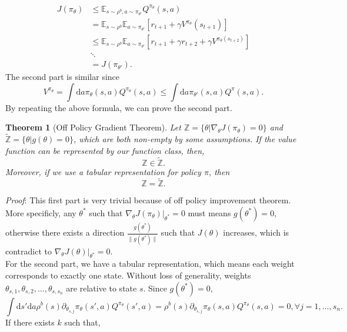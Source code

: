 \documentclass[11pt,a4paper]{article}
\def\tilde{\widetilde}
\def\d{{\mathrm d}}
\def\Z{{\mathbb Z}}
\def\tilde{\widetilde}
\def\E{\mathbb{E}}
\newtheorem{theorem}{Theorem}[subsection]
\begin{document}
\begin{align}
J(\pi_{\theta}) & \le \E_{s\sim \rho^b, a\sim \pi_{\theta'}}Q^{\pi_{\theta}}(s,a) \\ 
& = \E_{s\sim \rho^b}\E_{a\sim \pi_{\theta'}} [r_{t+1} + \gamma V^{\pi_{\theta}}(s_{t+1})] \\ 
& \le \E_{s\sim \rho^b}\E_{a\sim \pi_{\theta'}}[r_{t+1}+\gamma r_{t+2}+\gamma V^{\pi_{\theta}(s_{t+2})}] \\ 
& \ddots \\ 
& = J(\pi_{\theta'}).
\end{align}
The second part is similar since
\begin{equation}
V^{\pi_{\theta}} = \int \d a \pi_{\theta}(s,a)Q^{\pi_{\theta}}(s,a) \le \int \d a \pi_{\theta'}(s,a)Q^{\pi}(s,a).
\end{equation}
By repeating the above formula, we can prove the second part.
\begin{theorem}[Off Policy Gradient Theorem]
Let $\Z = \{\theta|\nabla_{\theta}J(\pi_{\theta})=0\}$ and $\tilde{\Z}=\{\theta|g(\theta)=0\}$, which are both non-empty by some assumptions. If the value function can be represented by our function class, then,
\begin{equation}
\Z \in \tilde{\Z}.
\end{equation}
Moreover, if we use a tabular representation for policy $\pi$, then
\begin{equation}
\Z = \tilde{\Z}.
\end{equation}
\end{theorem}
\emph{Proof}:
This first part is very trivial because of off policy improvement theorem. More specificly, any $\theta^*$ such that $\nabla_{\theta}J(\pi_{\theta})|_{\theta^*}=0$ must means $g(\theta^*) =0$, otherwise there exists a direction $\frac{g(\theta^*)}{\|g(\theta^*)\|}$ such that $J(\theta)$ increases, which is contradict to $\nabla_{\theta} J(\theta)|_{\theta^*}=0$.\\ 
For the second part, we have a tabular representation, which means each weight corresponds to exactly one state. Without loss of generality, weights $\theta_{s,1},\theta_{s,2},\ldots,\theta_{s,s_n}$ are relative to state $s$. Since $g(\theta^*) = 0$,
\begin{equation}
\label{eq:tabular1}
\int \d s' \d a \rho^b(s)\partial_{\theta_{s,j}}\pi_{\theta}(s',a) Q^{\pi_{\theta}}(s',a)= \rho^{b}(s)\partial_{\theta_{s,j}}\pi_{\theta}(s,a) Q^{\pi_{\theta}}(s,a) = 0, \forall j=1,\ldots,s_n.
\end{equation}
If there exists $k$ such that,
\end{document}
